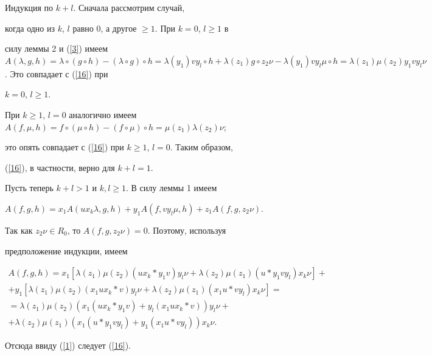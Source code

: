 \begin{pf} Индукция по $k+l$. Сначала рассмотрим случай,


когда одно из $k$, $l$ равно 0, а другое $\ge 1$. При $k=0$, $l\ge 1$ в


силу леммы 2 и (\ref{3}) имеем $A(\lambda ,g,h)=\lambda \circ (g


\circ h)-(\lambda \circ g) \circ h=\lambda (y_1)vy_l \circ h +


\lambda (z_1)g \circ z_2\nu -\lambda (y_1)vy_l\mu \circ h =


\lambda (z_1)\mu (z_2)y_1vy_l\nu $. Это совпадает с (\ref{16}) при


$k=0$, $l\ge 1$.





При $k\ge 1$, $l=0$ аналогично имеем $A(f,\mu ,h)=f \circ 


(\mu \circ h)-(f \circ \mu ) \circ h=\mu (z_1)\lambda (z_2)\nu $;


это опять совпадает с (\ref{16}) при $k\ge 1$, $l=0$. Таким образом,


(\ref{16}), в частности, верно для $k+l=1$.





Пусть теперь $k+l>1$ и $k, l\ge 1$. В силу леммы 1 имеем


$A(f,g,h)=x_1A(ux_k\lambda ,g,h)+y_1A(f,vy_l\mu ,h)+z_1A(f,g,z_2\nu )$.


Так как $z_2\nu \in R_0$, то $A(f,g,z_2\nu )=0$. Поэтому, используя


предположение индукции, имеем


\begin{gather*}


A(f,g,h)=


x_1[\lambda (z_1)\mu (z_2)(ux_k * y_1v)y_l\nu +


\lambda (z_2)\mu (z_1)(u * y_1vy_l)x_k\nu ]+\\


%


+y_1[\lambda (z_1)\mu (z_2)(x_1ux_k * v)y_l\nu +


\lambda (z_2)\mu (z_1)(x_1u * vy_l)x_k\nu ]=\\


%


=\lambda (z_1)\mu (z_2)(x_1(ux_k * y_1v)+y_l(x_1ux_k * v))y_l\nu +\\


%


+\lambda (z_2)\mu (z_1)(x_1(u * y_1vy_l)+y_1(x_1u * vy_l))x_k\nu.


\end{gather*}


Отсюда ввиду (\ref{1}) следует (\ref{16}).


\end{pf}





